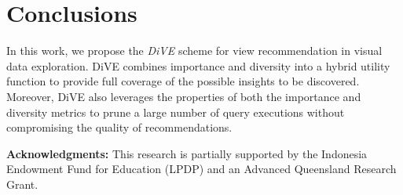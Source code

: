 
\section{Conclusions}
In this work, we propose the {\em DiVE} scheme for view recommendation in visual data exploration.
%
DiVE combines importance and diversity into a hybrid utility function to provide full coverage of the possible insights to be discovered. 
%
Moreover, DiVE also leverages the properties of both the importance and diversity metrics to prune a large number of query executions without compromising the quality of recommendations. 

\smallskip
{\bf Acknowledgments: } This research is partially supported by the Indonesia Endowment Fund for Education (LPDP) and an Advanced Queensland Research Grant. 



















%

